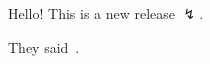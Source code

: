 \documentclass{exam}
\begin{document}
    Hello!
    This is a new release $\lightning$. 

    

    They said~\cite{book1}.

    
    

    \printindex
\end{document}
